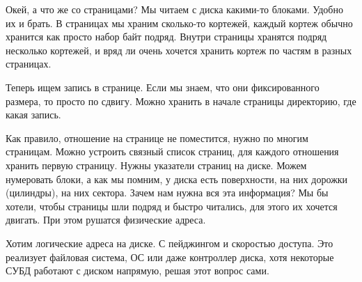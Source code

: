 Окей, а что же со страницами?
Мы читаем с диска какими-то блоками.
Удобно их и брать.
В страницах мы храним сколько-то кортежей, каждый кортеж обычно хранится как просто набор байт подряд.
Внутри страницы хранятся подряд несколько кортежей, и вряд ли очень хочется хранить кортеж по частям в разных страницах.

Теперь ищем запись в странице.
Если мы знаем, что они фиксированного размера, то просто по сдвигу.
Можно хранить в начале страницы директорию, где какая запись.

Как правило, отношение на странице не поместится, нужно по многим страницам.
Можно устроить связный список страниц, для каждого отношения хранить первую страницу.
Нужны указатели страниц на диске.
Можем нумеровать блоки, а как мы помним, у диска есть поверхности, на них дорожки (цилиндры), на них сектора.
Зачем нам нужна вся эта информация? Мы бы хотели, чтобы страницы шли подряд и быстро читались, для этого их хочется двигать.
При этом рушатся физические адреса.

Хотим логические адреса на диске.
С пейджингом и скоростью доступа.
Это реализует файловая система, ОС или даже контроллер диска, хотя некоторые СУБД работают с диском напрямую, решая этот вопрос сами.

